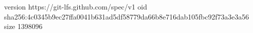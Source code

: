 version https://git-lfs.github.com/spec/v1
oid sha256:4c0345b9ec27ffa0041b631ad5df58779da66b8e716dab105fbc92f73a3e3a56
size 1398096
